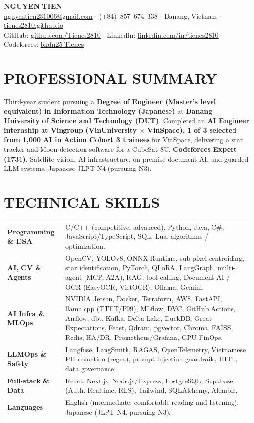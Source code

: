 \documentclass[10pt,a4paper]{article}
\begin{document}
\begin{center}
  {\LARGE\bfseries\color{navy}NGUYEN TIEN}\\[3pt]
  {\scriptsize
    \href{mailto:nguyentien281006@gmail.com}{nguyentien281006@gmail.com}
    $\cdot$ (+84)~857~674~338
    $\cdot$ Danang, Vietnam
    $\cdot$ \href{https://tienes2810.github.io}{tienes2810.github.io}\\[0.5pt]
    GitHub: \href{https://github.com/Tienes2810}{github.com/Tienes2810}
    $\cdot$ LinkedIn: \href{https://linkedin.com/in/tienes2810}{linkedin.com/in/tienes2810}
    $\cdot$ Codeforces: \href{https://codeforces.com/profile/bkdn25.Tienes}{bkdn25.Tienes}
  }
\end{center}

\section{PROFESSIONAL SUMMARY}
\small
Third-year student pursuing a \textbf{Degree of Engineer (Master's level equivalent) in Information Technology (Japanese)} at \textbf{Danang University of Science and Technology (DUT)}. Completed an \textbf{AI Engineer internship at Vingroup (VinUniversity $\times$ VinSpace), 1 of 3 selected from 1{,}000 AI in Action Cohort 3 trainees} for VinSpace, delivering a star tracker and Moon detection software for a CubeSat 8U. \textbf{Codeforces Expert (1731)}. Satellite vision, AI infrastructure, on-premise document AI, and guarded LLM systems. Japanese JLPT N4 (pursuing N3).

\section{TECHNICAL SKILLS}
\small
\begin{tabularx}{\textwidth}{@{}>{\bfseries}p{3.05cm} X@{}}
Programming \& DSA & C/C++ (competitive, advanced), Python, Java, C\#, JavaScript/TypeScript, SQL, Lua, algorithms / optimization. \\[0.4pt]
AI, CV \& Agents & OpenCV, YOLOv8, ONNX Runtime, sub-pixel centroiding, star identification, PyTorch, QLoRA, LangGraph, multi-agent (MCP, A2A), RAG, tool calling, Document AI / OCR (EasyOCR, VietOCR), Ollama, Gemini. \\[0.4pt]
AI Infra \& MLOps & NVIDIA Jetson, Docker, Terraform, AWS, FastAPI, llama.cpp (TTFT/P99), MLflow, DVC, GitHub Actions, Airflow, dbt, Kafka, Delta Lake, DuckDB, Great Expectations, Feast, Qdrant, pgvector, Chroma, FAISS, Redis, HA/DR, Prometheus/Grafana, GPU FinOps. \\[0.4pt]
LLMOps \& Safety & Langfuse, LangSmith, RAGAS, OpenTelemetry, Vietnamese PII redaction (regex), prompt-injection guardrails, HITL, data governance. \\[0.4pt]
Full-stack \& Data & React, Next.js, Node.js/Express, PostgreSQL, Supabase (Auth, Realtime, RLS), Tailwind, SQLAlchemy, Alembic. \\[0.4pt]
Languages & English (intermediate; comfortable reading and listening), Japanese (JLPT N4, pursuing N3).
\end{tabularx}
\end{document}
